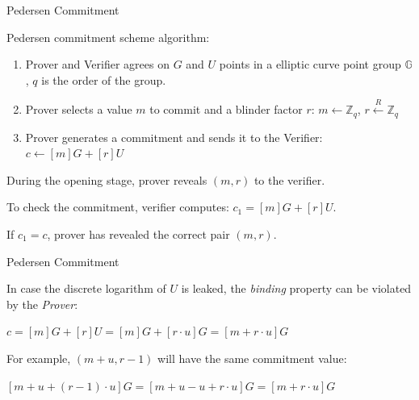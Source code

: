 \documentclass{zkdl-presentation-template}
\begin{document}
    \begin{frame}{Pedersen Commitment}

        \begin{definition}
            Pedersen commitment scheme algorithm:
            \begin{enumerate}
                \item Prover and Verifier agrees on $G$ and $U$ points in a elliptic curve point group $\mathbb{G}$, $q$ is the order of the group.
                \item Prover selects a value $m$ to commit and a blinder factor $r$:
                        $m \leftarrow \mathbb{Z}_q$,
                        $r \xleftarrow{R} \mathbb{Z}_q$
                \item Prover generates a commitment and sends it to the Verifier:
                        $c \gets [m]G + [r]U$
            \end{enumerate}
        \end{definition}

        During the opening stage, prover reveals $(m, r)$ to the verifier. 
        
        To check the commitment, verifier computes: $c_1 = [m]G + [r]U$. 
        
        If $c_1 = c$, prover has revealed the correct pair $(m, r)$.

    \end{frame}

    \begin{frame}{Pedersen Commitment}

            In case the discrete logarithm of $U$ is leaked, the \textit{binding} property can be violated by the \textit{Prover}:
        
            \begin{center}
                $c = [m]G + [r]U = [m] G + [r \cdot u]G = [m + r \cdot u] G$
            \end{center}
        
            For example, $(m + u, r - 1)$ will have the same commitment value:
        
            \begin{center}
                $[m+u + (r-1) \cdot u] G = [m + u - u + r \cdot u] G = [m + r \cdot u] G$     
            \end{center}
            
    \end{frame}
\end{document}
